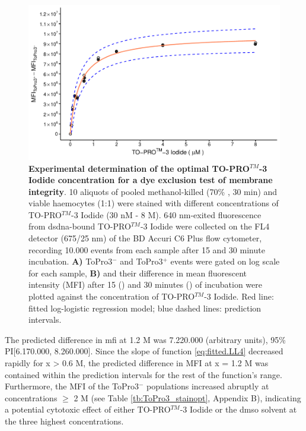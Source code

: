 \begin{figure}[h]
    \centering
    \includegraphics[width=1.0\textwidth]{figures/Method development/ToPro3 LL4.pdf}
    \caption{\textbf{Experimental determination of the optimal TO-PRO$^{TM}$-3 Iodide concentration for a dye exclusion test of membrane integrity}. 10 aliquots of pooled methanol-killed (70\% , 30 min) and viable haemocytes (1:1) were stained with different concentrations of TO-PRO$^{TM}$-3 Iodide (30 nM - 8 \micro M). 640 nm-exited fluorescence from \acrshort{dsdna}-bound TO-PRO$^{TM}$-3 Iodide were collected on the FL4 detector (675/25 nm) of the BD Accuri C6 Plus flow cytometer, recording 10.000 events from each sample after 15 and 30 minute incubation. \textbf{A)} ToPro3$^{-}$ and ToPro3$^{+}$ events were gated on log scale for each sample, \textbf{B)} and their difference in mean fluorescent intensity (MFI) after 15 (\protect\lysegraacircle) and 30 minutes (\protect\darkgraycircle) of incubation were plotted against the concentration of TO-PRO$^{TM}$-3 Iodide. Red line: fitted log-logistic regression model; blue dashed lines: prediction intervals.}
    \label{fig:ToPro3_stain_opt}
\end{figure}

The predicted difference in \acrshort{mfi} at 1.2 \micro M was 7.220.000 (arbitrary units), 95\% PI[6.170.000, 8.260.000]. Since the slope of function \ref{eq:fitted.LL4} decreased rapidly for x > 0.6 \micro M, the predicted difference in MFI at x = 1.2 \micro M was contained within the prediction intervals for the rest of the function's range. Furthermore, the MFI of the ToPro3$^{-}$ populations increased abruptly at concentrations $\geq$ 2 \micro M (see Table \ref{tb:ToPro3_stainopt}, Appendix B), indicating a potential cytotoxic effect of either TO-PRO$^{TM}$-3 Iodide or the \acrshort{dmso} solvent at the three highest concentrations.

